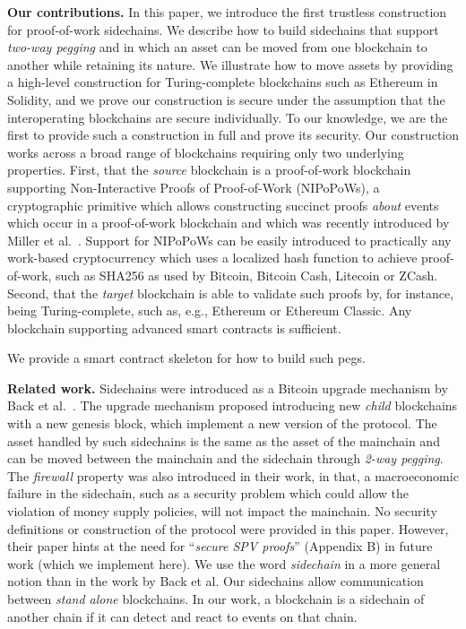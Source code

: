 \noindent\textbf{Our contributions. } In this paper, we introduce the first
trustless construction for proof-of-work sidechains. We describe how to build
sidechains that support \emph{two-way pegging} and in which an asset can be
moved from one blockchain to another while retaining its nature. We illustrate
how to move assets by providing a high-level construction for Turing-complete
blockchains such as Ethereum in Solidity, and we prove our construction is
secure under the assumption that the interoperating blockchains are secure
individually. To our knowledge, we are the first to provide such a construction
in full and prove its security. Our construction works across a broad range of
blockchains requiring only two underlying properties. First, that the
\emph{source} blockchain is a proof-of-work blockchain supporting
Non-Interactive Proofs of Proof-of-Work (NIPoPoWs), a cryptographic primitive
which allows constructing succinct proofs \emph{about} events which occur in a
proof-of-work blockchain and which was recently introduced by Miller et
al.~\cite{nipopows}. Support for NIPoPoWs can be easily introduced to practically
any work-based cryptocurrency which uses a localized hash function to achieve
proof-of-work, such as SHA256 as used by Bitcoin, Bitcoin Cash, Litecoin or
ZCash. Second, that the \emph{target} blockchain is able to validate such proofs
by, for instance, being Turing-complete, such as, e.g., Ethereum or Ethereum
Classic. Any blockchain supporting advanced smart contracts is sufficient.

We provide a smart contract skeleton for how to build such pegs.

\noindent\textbf{Related work. }
Sidechains were introduced as a Bitcoin upgrade mechanism by Back et
al.~\cite{sidechains}. The upgrade mechanism proposed introducing new
\emph{child} blockchains with a new genesis block, which implement a new version
of the protocol. The asset handled by such sidechains is the same as the asset
of the mainchain and can be moved between the mainchain and the sidechain
through \emph{2-way pegging}. The \emph{firewall} property was also introduced
in their work, in that, a macroeconomic failure in the sidechain, such as a
security problem which could allow the violation of money supply policies, will
not impact the mainchain. No security definitions or construction of the
protocol were provided in this paper. However, their paper hints at the need for
``\emph{secure SPV proofs}'' (Appendix B) in future work (which we implement
here). We use the word \emph{sidechain} in a more general notion than in the
work by Back et al. Our sidechains allow communication between \emph{stand
alone} blockchains. In our work, a blockchain is a sidechain of another chain if
it can detect and react to events on that chain.

